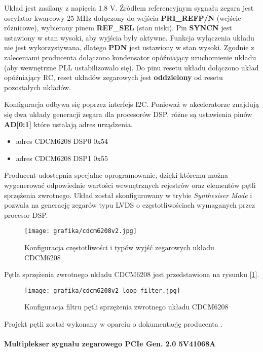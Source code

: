 Układ jest zasilany z napięcia 1.8 V. Źródłem referencyjnym sygnału zegara jest oscylator kwarcowy 25 MHz dołączony do wejścia \textbf{PRI\_REFP/N} (wejście różnicowe),  wybierany pinem \textbf{REF\_SEL} (stan niski). Pin \textbf{SYNCN} jest ustawiony w stan wysoki, aby wyjścia były aktywne. Funkcja wyłączenia układu nie jest wykorzystywana, dlatego \textbf{PDN} jest ustawiony w stan wysoki. Zgodnie z zaleceniami producenta dołączono kondensator opóźniający uruchomienie układu (aby wewnętrzne PLL ustabilizowało się).  Do pinu resetu układu dołączono układ opóźniający RC, reset układów zegarowych jest \textbf{oddzielony} od resetu pozostałych układów.  

Konfiguracja odbywa się poprzez interfejs I2C. Ponieważ w akceleratorze znajdują się dwa układy generacji zegara dla procesorów DSP, różne są ustawienia pinów \textbf{AD[0:1]} które ustalają adres urządzenia.


\begin{itemize}
\item
adres CDCM6208 DSP0 0x54 
\item
adres CDCM6208 DSP1 0x55
\end{itemize}



Producent udostępnia specjalne oprogramowanie, dzięki któremu można wygenerować odpowiednie wartości wewnętrznych rejestrów oraz elementów pętli sprzężenia zwrotnego. Układ został skonfigurowany w trybie \textit{Synthesiser Mode} i pozwala na generację zegarów typu LVDS o częstotliwościach wymaganych przez procesor DSP. 
\begin{figure}[!h]
\centering
\texttt{[image: grafika/cdcm6208v2.jpg]}
\caption{Konfiguracja częstotliwości i typów wyjść zegarowych układu CDCM6208}
\end{figure}

Pętla sprzężenia zwrotnego układu CDCM6208 jest przedstawiona na rysunku [\ref{fig:cdcm6208_loop}].

\begin{figure}[!h]
\centering
\texttt{[image: grafika/cdcm6208v2\_loop\_filter.jpg]}
\caption{Konfiguracja filtru pętli sprzężenia zwrotnego układu CDCM6208}
\label{fig:cdcm6208_loop}
\end{figure}

Projekt pętli został wykonany w oparciu o dokumentację producenta  \cite{CDCM6208:INFO1} \cite{CDCM6208:INFO2}. 

\paragraph{Multiplekser sygnału zegarowego PCIe Gen. 2.0 5V41068A}


